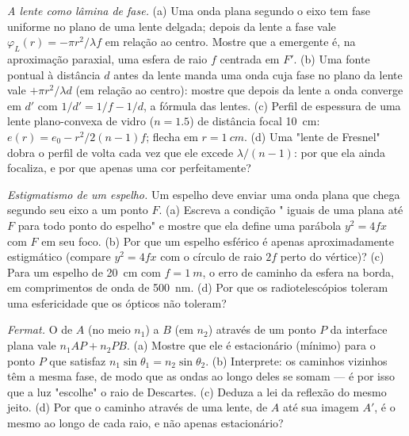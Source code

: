 \begin{exercise}[$\star\star$]\label{exo:b2:scalar-light-model:5}
\emph{A lente como lâmina de fase.} (a) Uma onda plana segundo o eixo tem
fase uniforme no plano de uma lente delgada; depois da lente a fase vale
$\varphi_L(r) = -\pi r^2/\lambda f$ em relação ao centro. Mostre que a 
emergente é, na aproximação paraxial, uma esfera de raio $f$
centrada em $F'$. (b) Uma fonte pontual à distância $d$ antes da lente
manda uma onda cuja fase no plano da lente vale $+\pi r^2/\lambda d$ (em relação ao
centro): mostre que depois da lente a onda converge em $d'$ com
$1/d' = 1/f - 1/d$, a fórmula das lentes. (c) Perfil de espessura de uma
lente plano-convexa de vidro ($n = 1.5$) de distância focal \qty{10}{cm}: $e(r) =
e_0 - r^2/2(n - 1)f$; flecha em $r = \qty{1}{cm}$. (d) Uma "lente de Fresnel" dobra
o perfil de volta cada vez que ele excede $\lambda/(n - 1)$: por que ela ainda
focaliza, e por que apenas uma cor perfeitamente?
\end{exercise}

\begin{exercise}[$\star\star$]\label{exo:b2:scalar-light-model:6}
\emph{Estigmatismo de um espelho.} Um espelho deve enviar uma onda plana que chega
segundo seu eixo a um ponto $F$. (a) Escreva a condição "
iguais de uma  plana até $F$ para todo ponto do espelho" e
mostre que ela define uma parábola $y^2 = 4fx$ com $F$ em seu foco. (b) Por que um
espelho esférico é apenas aproximadamente estigmático (compare $y^2 = 4fx$ com
o círculo de raio $2f$ perto do vértice)? (c) Para um espelho de \qty{20}{cm}
com $f = \qty{1}{m}$, o erro de caminho da esfera na borda, em
comprimentos de onda de \qty{500}{nm}. (d) Por que os radiotelescópios toleram
uma esfericidade que os ópticos não toleram?
\end{exercise}

\begin{exercise}[$\star\star$]\label{exo:b2:scalar-light-model:7}
\emph{Fermat.} O  de $A$ (no meio $n_1$) a $B$ (em
$n_2$) através de um ponto $P$ da interface plana vale $n_1AP + n_2PB$. (a)
Mostre que ele é estacionário (mínimo) para o ponto $P$ que satisfaz
$n_1\sin\theta_1 = n_2\sin\theta_2$. (b) Interprete: os caminhos vizinhos têm a
mesma fase, de modo que as ondas ao longo deles se somam --- é por isso que a luz
"escolhe" o raio de Descartes. (c) Deduza a lei da reflexão do mesmo
jeito. (d) Por que o caminho através de uma lente, de $A$ até sua imagem $A'$, é o
mesmo ao longo de cada raio, e não apenas estacionário?
\end{exercise}

